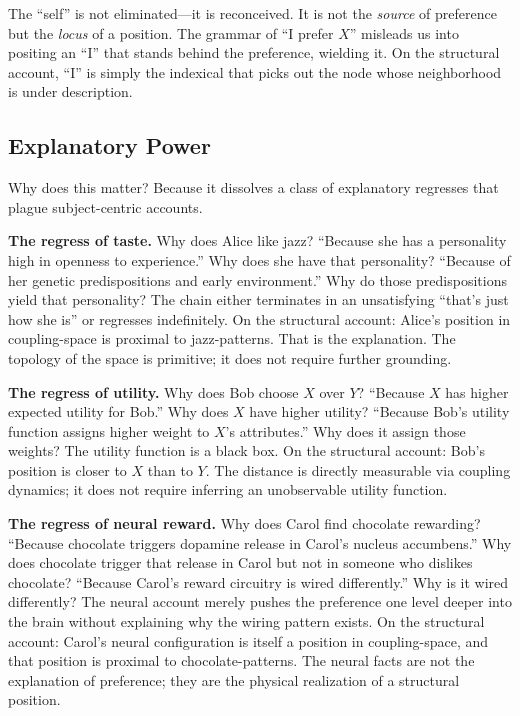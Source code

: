 \documentclass[12pt,a4paper]{article}
\begin{document}
The ``self'' is not eliminated---it is reconceived. It is not the \emph{source} of preference but the \emph{locus} of a position. The grammar of ``I prefer $X$'' misleads us into positing an ``I'' that stands behind the preference, wielding it. On the structural account, ``I'' is simply the indexical that picks out the node whose neighborhood is under description.

\subsection{Explanatory Power}

Why does this matter? Because it dissolves a class of explanatory regresses that plague subject-centric accounts.

\textbf{The regress of taste.} Why does Alice like jazz? ``Because she has a personality high in openness to experience.'' Why does she have that personality? ``Because of her genetic predispositions and early environment.'' Why do those predispositions yield that personality? The chain either terminates in an unsatisfying ``that's just how she is'' or regresses indefinitely. On the structural account: Alice's position in coupling-space is proximal to jazz-patterns. That is the explanation. The topology of the space is primitive; it does not require further grounding.

\textbf{The regress of utility.} Why does Bob choose $X$ over $Y$? ``Because $X$ has higher expected utility for Bob.'' Why does $X$ have higher utility? ``Because Bob's utility function assigns higher weight to $X$'s attributes.'' Why does it assign those weights? The utility function is a black box. On the structural account: Bob's position is closer to $X$ than to $Y$. The distance is directly measurable via coupling dynamics; it does not require inferring an unobservable utility function.

\textbf{The regress of neural reward.} Why does Carol find chocolate rewarding? ``Because chocolate triggers dopamine release in Carol's nucleus accumbens.'' Why does chocolate trigger that release in Carol but not in someone who dislikes chocolate? ``Because Carol's reward circuitry is wired differently.'' Why is it wired differently? The neural account merely pushes the preference one level deeper into the brain without explaining why the wiring pattern exists. On the structural account: Carol's neural configuration is itself a position in coupling-space, and that position is proximal to chocolate-patterns. The neural facts are not the explanation of preference; they are the physical realization of a structural position.
\end{document}
